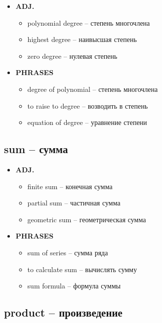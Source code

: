 \documentclass[a4paper, 10pt]{article}
\theoremstyle{definition}
\theoremstyle{plain}
\theoremstyle{remark}
\begin{document}
\begin{itemize}
    \item \textbf{ADJ.}
    \begin{itemize}
        \item polynomial degree – степень многочлена
        \item highest degree – наивысшая степень
        \item zero degree – нулевая степень
    \end{itemize}
    
    \item \textbf{PHRASES}
    \begin{itemize}
        \item degree of polynomial – степень многочлена
        \item to raise to degree – возводить в степень
        \item equation of degree – уравнение степени
    \end{itemize}
\end{itemize}

\subsection{sum – сумма}

\begin{itemize}
    \item \textbf{ADJ.}
    \begin{itemize}
        \item finite sum – конечная сумма
        \item partial sum – частичная сумма
        \item geometric sum – геометрическая сумма
    \end{itemize}
    
    \item \textbf{PHRASES}
    \begin{itemize}
        \item sum of series – сумма ряда
        \item to calculate sum – вычислять сумму
        \item sum formula – формула суммы
    \end{itemize}
\end{itemize}

\subsection{product – произведение}
\end{document}
